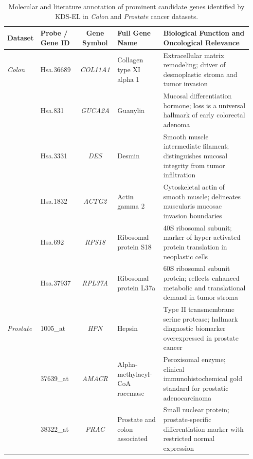 \begin{table}[!htb]
\centering
\caption{Molecular and literature annotation of prominent candidate genes identified by KDS-EL in \textit{Colon} and \textit{Prostate} cancer datasets.}
\label{T-S10}
\footnotesize
\setlength{\tabcolsep}{3.5pt}
\renewcommand{\arraystretch}{1.15}
\begin{tabular}{@{}llcp{2.8cm}p{5.6cm}@{}}
\toprule
Dataset & Probe / Gene ID & Gene Symbol & Full Gene Name & Biological Function and Oncological Relevance \\
\midrule
\textit{Colon} & Hsa.36689 & \textit{COL11A1} & Collagen type XI alpha 1 & Extracellular matrix remodeling; driver of desmoplastic stroma and tumor invasion~\cite{fischer2001} \\
 & Hsa.831 & \textit{GUCA2A} & Guanylin & Mucosal differentiation hormone; loss is a universal hallmark of early colorectal adenoma~\cite{alon1999} \\
 & Hsa.3331 & \textit{DES} & Desmin & Smooth muscle intermediate filament; distinguishes mucosal integrity from tumor infiltration~\cite{alon1999} \\
 & Hsa.1832 & \textit{ACTG2} & Actin gamma 2 & Cytoskeletal actin of smooth muscle; delineates muscularis mucosae invasion boundaries~\cite{alon1999} \\
 & Hsa.692 & \textit{RPS18} & Ribosomal protein S18 & 40S ribosomal subunit; marker of hyper-activated protein translation in neoplastic cells~\cite{alon1999} \\
 & Hsa.37937 & \textit{RPL37A} & Ribosomal protein L37a & 60S ribosomal subunit protein; reflects enhanced metabolic and translational demand in tumor stroma~\cite{alon1999} \\
\midrule
\textit{Prostate} & 1005\_at & \textit{HPN} & Hepsin & Type II transmembrane serine protease; hallmark diagnostic biomarker overexpressed in prostate cancer~\cite{singh2002} \\
 & 37639\_at & \textit{AMACR} & Alpha-methylacyl-CoA racemase & Peroxisomal enzyme; clinical immunohistochemical gold standard for prostatic adenocarcinoma~\cite{rubin2002} \\
 & 38322\_at & \textit{PRAC} & Prostate and colon associated & Small nuclear protein; prostate-specific differentiation marker with restricted normal expression~\cite{singh2002} \\
\bottomrule
\end{tabular}
\end{table}
